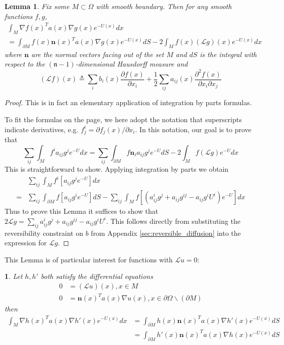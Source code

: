 \documentclass[english, aip, jcp, priprint, graphicx,floatfix]{revtex4-1}
\newtheorem{lemma}{Lemma}
\theoremstyle{plain}
\theoremstyle{definition}
\theoremstyle{plain}
\newtheorem{cor}[thm]{\protect\corollaryname}
\newcommand{\dimension}{{\mathfrak{n}}}
\providecommand{\corollaryname}{Corollary}
\begin{document}
\begin{lemma}  \label{lem:greenident}Fix some $M \subset \Omega$ with smooth boundary.  Then for any smooth functions $f,g$,
\begin{gather*}
\int_{M} \nabla f(x)^T a(x) \nabla g(x) e^{-U(x)}dx \\
= \int_{\partial M} f(x) \mathbf{n}(x)^T a(x) \nabla g(x) e^{-U(x)}dS - 2\int_{M} f(x) (\mathcal{L}g)(x)e^{-U(x)}dx
\end{gather*}
where $\mathbf{n}$ are the normal vectors facing out of the set $M$ and $dS$ is the integral with respect to the $(\dimension-1)$-dimensional Hausdorff measure and 
\[
(\mathcal{L}f)(x) \triangleq \sum_i b_i(x) \frac{\partial f (x)}{\partial x_i} + 
    \frac{1}{2} \sum_{ij}a_{ij}(x)\frac{\partial^2 f(x)}{\partial x_i \partial x_j} 
\]
\end{lemma}
\begin{proof}
This is in fact an elementary application of integration by parts formulas.  

To fit the formulas on the page, we here adopt the notation that superscripts indicate derivatives, e.g. $f^i_j  = \partial f_j(x)/\partial x_i$.  In this notation, our goal is to prove that
\[
\sum_{ij} \int_{M} f^i a_{ij} g^j e^{-U}dx 
= \sum_{ij}\int_{\partial M} f \mathbf{n}_i a_{ij} g^j e^{-U}dS - 2\int_{M} f (\mathcal{L}g)e^{-U}dx
\]
This is straightforward to show.  Applying integration by parts we obtain
    \begin{align*}
    &\sum_{ij} \int_{M} f^i \left[a_{ij} g^j e^{-U}\right]dx \\ 
    =&\sum_{ij} \int_{\partial M} f \left[a_{ij} g^i e^{-U}\right]dS - 
            \sum_{ij}\int_{M} f  \left[(a^i_{ij} g^j +a_{ij} g^{ij} - a_{ij} g^i U^i) e^{-U}\right]dx
    \end{align*}
Thus to prove this Lemma it suffices to show that $2\mathcal{L}g=\sum_{ij}a^i_{ij} g^j +a_{ij} g^{ij} - a_{ij} g^i U^i$.  This follows directly from substituting the reversibility constraint on $b$ from Appendix \ref{sec:reversible_diffusion} into the expression for $\mathcal{L}g$.
\end{proof}

This Lemma is of particular interest for functions with $\mathcal Lu=0$:

\begin{cor}\label{cor:greenident}
Let $h,h'$ both satisfy the differential equations
\begin{align*}
0 &= (\mathcal{L}u)(x) ,x\in M \\
0 &= \mathbf{n}(x)^Ta(x)\nabla u(x), x \in \partial{\Omega} \backslash (\partial M)
\end{align*}
then
\begin{align*}
\int_{M} \nabla h(x)^T a(x) \nabla h'(x) e^{-U(x)}dx 
    &= \int_{\partial M} h(x) \mathbf{n}(x)^T a(x) \nabla h'(x) e^{-U(x)}dS \\
    &= \int_{\partial M} h'(x) \mathbf{n}(x)^T a(x) \nabla h(x) e^{-U(x)}dS 
\end{align*}
\end{cor}
\end{document}
